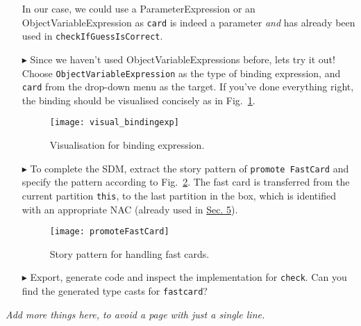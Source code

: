 \begin{itemize}
In our case, we could use a ParameterExpression or an ObjectVariableExpression as \texttt{card} is indeed a parameter \emph{and} has already been used in
\texttt{checkIfGuessIsCorrect}. 

\item[$\blacktriangleright$] Since we haven't used ObjectVariableExpressions before, lets try it out! Choose \texttt{ObjectVariableExpression} as the type of
binding expression, and \texttt{card} from the drop-down menu as the target. If you've done everything right, the binding should be visualised concisely as in
Fig.~\ref{fig:sdm_fastcard_4}.
 
\begin{figure}[htbp]
\begin{center}
  \texttt{[image: visual\_bindingexp]}
  \caption{Visualisation for binding expression.}  
  \label{fig:sdm_fastcard_4}
\end{center}
\end{figure}

\item[$\blacktriangleright$] To complete the SDM, extract the story pattern of \texttt{promote FastCard} and specify the pattern according to
Fig.~\ref{fig:sdm_fastcard_5}.
The fast card is transferred from the current partition \texttt{this}, to the last partition in the box, which is identified with an appropriate \mbox{NAC}
(already used in \hyperlink{sec:growBox}{Sec. 5}).

\begin{figure}[htbp]
\begin{center}
  \texttt{[image: promoteFastCard]}
  \caption{Story pattern for handling fast cards.}  
  \label{fig:sdm_fastcard_5}
\end{center}
\end{figure}

\item[$\blacktriangleright$] Export, generate code and inspect the implementation for \texttt{check}.  Can you find the generated type casts for \texttt{fastcard}?

\end{itemize}

\emph{Add more things here, to avoid a page with just a single line.}